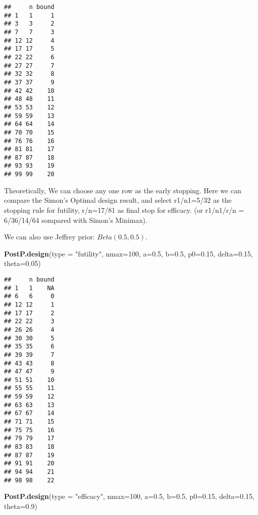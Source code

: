 \documentclass[]{article}
\newenvironment{Shaded}{\begin{snugshade}}{\end{snugshade}}
\newcommand{\KeywordTok}[1]{\textcolor[rgb]{0.13,0.29,0.53}{\textbf{{#1}}}}
\newcommand{\DataTypeTok}[1]{\textcolor[rgb]{0.13,0.29,0.53}{{#1}}}
\newcommand{\DecValTok}[1]{\textcolor[rgb]{0.00,0.00,0.81}{{#1}}}
\newcommand{\FloatTok}[1]{\textcolor[rgb]{0.00,0.00,0.81}{{#1}}}
\newcommand{\StringTok}[1]{\textcolor[rgb]{0.31,0.60,0.02}{{#1}}}
\newcommand{\NormalTok}[1]{{#1}}
\begin{document}
\begin{verbatim}
##     n bound
## 1   1     1
## 3   3     2
## 7   7     3
## 12 12     4
## 17 17     5
## 22 22     6
## 27 27     7
## 32 32     8
## 37 37     9
## 42 42    10
## 48 48    11
## 53 53    12
## 59 59    13
## 64 64    14
## 70 70    15
## 76 76    16
## 81 81    17
## 87 87    18
## 93 93    19
## 99 99    20
\end{verbatim}

Theoretically, We can choose any one row as the early stopping. Here we
can compare the Simon's Optimal design result, and select r1/n1=5/32 as
the stopping rule for futility, r/n=17/81 as final stop for efficacy.
(or r1/n1/r/n = 6/36/14/64 sompared with Simon's Minimax).

We can also use Jeffrey prior: \(Beta(0.5,0.5)\).

\begin{Shaded}
\begin{Highlighting}[]
\KeywordTok{PostP.design}\NormalTok{(}\DataTypeTok{type =} \StringTok{"futility"}\NormalTok{, }\DataTypeTok{nmax=}\DecValTok{100}\NormalTok{, }\DataTypeTok{a=}\FloatTok{0.5}\NormalTok{, }\DataTypeTok{b=}\FloatTok{0.5}\NormalTok{, }\DataTypeTok{p0=}\FloatTok{0.15}\NormalTok{, }\DataTypeTok{delta=}\FloatTok{0.15}\NormalTok{, }\DataTypeTok{theta=}\FloatTok{0.05}\NormalTok{)}
\end{Highlighting}
\end{Shaded}

\begin{verbatim}
##     n bound
## 1   1    NA
## 6   6     0
## 12 12     1
## 17 17     2
## 22 22     3
## 26 26     4
## 30 30     5
## 35 35     6
## 39 39     7
## 43 43     8
## 47 47     9
## 51 51    10
## 55 55    11
## 59 59    12
## 63 63    13
## 67 67    14
## 71 71    15
## 75 75    16
## 79 79    17
## 83 83    18
## 87 87    19
## 91 91    20
## 94 94    21
## 98 98    22
\end{verbatim}

\begin{Shaded}
\begin{Highlighting}[]
\KeywordTok{PostP.design}\NormalTok{(}\DataTypeTok{type =} \StringTok{"efficacy"}\NormalTok{, }\DataTypeTok{nmax=}\DecValTok{100}\NormalTok{, }\DataTypeTok{a=}\FloatTok{0.5}\NormalTok{, }\DataTypeTok{b=}\FloatTok{0.5}\NormalTok{, }\DataTypeTok{p0=}\FloatTok{0.15}\NormalTok{, }\DataTypeTok{delta=}\FloatTok{0.15}\NormalTok{, }\DataTypeTok{theta=}\FloatTok{0.9}\NormalTok{)}
\end{Highlighting}
\end{Shaded}
\end{document}
